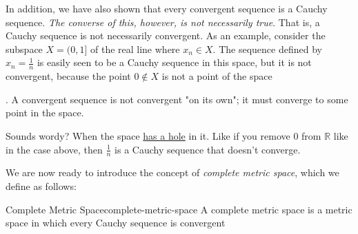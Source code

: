 In addition, we have also shown that every convergent sequence is a Cauchy sequence. \textit{The converse of this,
however, is not necessarily true}. That is, a Cauchy sequence is not necessarily convergent. As an example, consider the
subspace $X = (0, 1]$ of the real line where $x_n \in X$. The sequence defined by $x_n = \frac{1}{n}$ is easily seen to
be a Cauchy sequence in this space, but it is not convergent, because the point $0 \not\in X$ is not a point of the
space

\begin{center}
\end{center}

. A convergent sequence is not convergent "on its own"; it must converge to
some point in the space.

Sounds wordy? When the space \href{https://www.reddit.com/r/learnmath/comments/exp735/comment/fgaqd8p/?utm\_source=share&utm\_medium=web3x&utm\_name=web3xcss&utm\_term=1&utm\_content=share\_button}{has a hole} in it. Like if you remove 0 from $\mathbb{R}$ like in the case above, then
$\frac{1}{n}$ is a Cauchy sequence that doesn't converge.

We are now ready to introduce the concept of \textit{complete metric space}, which we define as follows:

\begin{Definition}{Complete Metric Space}{complete-metric-space}
    A complete metric space is a metric space in which every Cauchy sequence is convergent
\end{Definition}

